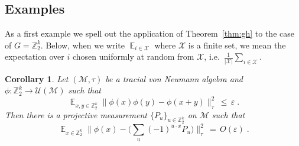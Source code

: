 \documentclass[11pt]{article}
\newtheorem{corollary}[theorem]{Corollary}
\theoremstyle{definition}
\DeclareMathOperator*{\Expectation}{\mathbb{E}}
\newcommand{\Es}[1]{\Expectation_{#1}}
\newcommand{\C}{\ensuremath{\mathbb{C}}}
\newcommand{\Z}{\ensuremath{\mathbb{Z}}}
\newcommand{\mM}{\ensuremath{\mathcal{M}}}
\newcommand{\mU}{\ensuremath{\mathcal{U}}}
\newcommand{\mX}{\ensuremath{\mathcal{X}}}
\newcommand{\eps}{\varepsilon}
\begin{document}
\subsection{Examples}

As a first example we spell out the application of Theorem~\ref{thm:gh} to the case of $G=\Z_2^k$. 
Below, when we write $\Es{i\in \mX}$ where $\mX$ is a finite set, we mean the expectation over $i$ chosen uniformly at random from $\mX$, i.e.\ $\frac{1}{|\mX|} \sum_{i\in \mX}$. 

\begin{corollary}\label{cor:lin-test} %
Let $(\mM,\tau)$ be a tracial von Neumann algebra and $\phi:\Z_2^k \to \mU(\mM)$ such that 
\[ \Es{x,y\in \Z_2^k} \big\| \phi(x)\phi(y)-\phi(x+y) \big\|_{\tau}^2 \,\leq\,\eps\;.\]
Then there is a %
projective measurement $\{P_u\}_{u\in \Z_2^k}$ on $\mM$ such that 
\[ \Es{x\in \Z_2^k} \Big\| \phi(x) -\Big(\sum_u (-1)^{u\cdot x} P_u\Big)  \Big\|_{\tau}^2 \,=\, O(\eps)\;.\]
\end{corollary} 
\end{document}
